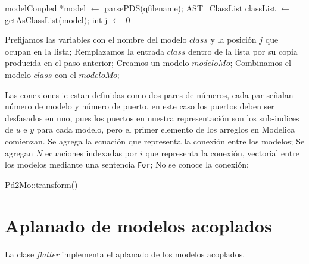 \begin{algorithm}[H]
\begin{algorithmic}[1]
\State modelCoupled *model $\gets$ parsePDS(qfilename);
\State AST\_ClassList classList $\gets$ getAsClassList(model); 
\State int j $\gets$ 0\;

 		\State Prefijamos las variables con el nombre del modelo $class$ y la posición $j$ que ocupan en la lista;
 		\State Remplazamos la entrada $class$ dentro de la lista por su copia producida en el paso anterior;
 	\EndIf
\EndFor
\State Creamos un modelo $modeloMo$;
 	\State Combinamos el modelo $class$ con el $modeloMo$;
\EndFor

	\State Las conexiones ic estan definidas como dos pares de números, cada par señalan número  de modelo y número de puerto, en este caso los puertos deben ser desfasados en uno, pues los puertos en nuestra representación son los sub-indices de $u$ e $y$ para cada modelo, pero el primer elemento de los arreglos en Modelica comienzan.
  		\State Se agrega la ecuación que representa la conexión entre los modelos;
  		\State Se agregan $N$ ecuaciones indexadas por $i$ que representa la conexión, vectorial entre los modelos mediante una sentencia \texttt{For};
  	\Else
  		\State No se conoce la conexión;
	\EndIf
\EndFor
\end{algorithmic}
 \caption{Pd2Mo::transform()}
\end{algorithm}

\section{Aplanado de modelos acoplados}
La clase \emph{flatter} implementa el aplanado de los modelos acoplados.
 
